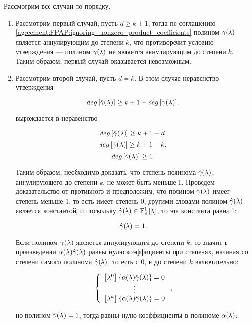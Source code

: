 \begin{statement}
	Рассмотрим все случаи по порядку.

	\begin{enumerate}
		\item
			Рассмотрим первый случай, пусть $d \ge k + 1$, тогда по соглашению \ref{agreement:FPAP:ignoring_nonzero_product_coefficients} полином
			$\gamma (\lambda)$ является аннулирующим до степени $k$, что противоречит условию утверждения --- полином $\gamma (\lambda)$ не
			является аннулирующим до степени $k$. Таким образом, первый случай оказывается невозможным.

		\item
			Рассмотрим второй случай, пусть $d = k$. В этом случае неравенство утверждения

				$$ deg \left [ \hat\gamma (\lambda) \right ] \ge k + 1 - deg \left [ \gamma (\lambda) \right ]. $$

			вырождается в неравенство

				$$ deg \left [ \hat\gamma (\lambda) \right ] \ge k + 1 - d. $$
				$$ deg \left [ \hat\gamma (\lambda) \right ] \ge k + 1 - k. $$
				$$ deg \left [ \hat\gamma (\lambda) \right ] \ge 1. $$

			Таким образом, необходимо доказать, что степень полинома $\hat\gamma (\lambda)$, аннулирующего до степени $k$, не может быть
			меньше 1. Проведем доказательство от противного и предположим, что полином $\hat\gamma (\lambda)$ имеет степень меньше 1, то есть
			имеет степень 0, другими словами полином $\hat\gamma (\lambda)$ является константой, и поскольку
			$\hat\gamma (\lambda) \in \mathbb{F}_p^1 \left [ \lambda \right ]$, то эта константа равна 1:

				$$ \hat\gamma (\lambda) = 1. $$

			Если полином $\hat\gamma (\lambda)$ является аннулирующим до степени $k$, то значит в произведении
			$\alpha (\lambda) \hat\gamma (\lambda)$ равны нулю коэффициенты при степенях, начиная со степени самого полинома
			$\hat\gamma (\lambda)$, то есть с 0, и до степени $k$ включительно:

				$$
					\left \{
					\begin{array}{c}
						\left [ \lambda^{0} \right ] \left \{ \alpha (\lambda) \hat\gamma (\lambda) \right \} = 0 \\
						\vdots \\
						\left [ \lambda^{k} \right ] \left \{ \alpha (\lambda) \hat\gamma (\lambda) \right \} = 0 \\
					\end{array}
					\right .
					,
				$$

				но полином $\hat\gamma (\lambda) = 1$, тогда равны нулю коэффициенты в полиноме $\alpha (\lambda)$:


\end{enumerate}
\end{statement}
